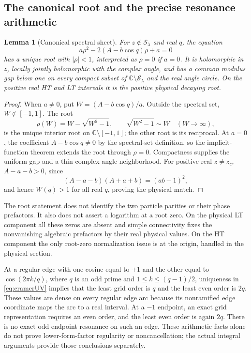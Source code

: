 \documentclass[11pt]{article}
\numberwithin{equation}{section}
\newtheorem{lemma}[theorem]{Lemma}
\theoremstyle{definition}
\newcommand{\C}{\mathbb C}
\newcommand{\cS}{\mathcal S}
\begin{document}
\subsection{The canonical root and the precise resonance arithmetic}

\begin{lemma}[Canonical spectral sheet]\label{lem:canonicalroot}
For \(z\notin\cS_\lambda\) and real \(q\), the equation
\[
 a\rho^2-2(A-b\cos q)\rho+a=0
\]
has a unique root with \(|\rho|<1\), interpreted as \(\rho=0\) if
\(a=0\). It is holomorphic in \(z\), locally jointly holomorphic
with the complex angle, and has a common modulus gap below one on
every compact subset of \(\C\setminus\cS_\lambda\) and the real
angle circle. On the positive real HT and LT intervals it is the
positive physical decaying root.
\end{lemma}
\begin{proof}
When \(a\ne0\), put \(W=(A-b\cos q)/a\). Outside the spectral set,
\(W\notin[-1,1]\). The root
\[
 \rho(W)=W-\sqrt{W^2-1},\qquad \sqrt{W^2-1}\sim W\quad(W\to\infty),
\]
is the unique interior root on \(\C\setminus[-1,1]\); the other root
is its reciprocal. At \(a=0\), the coefficient \(A-b\cos q\ne0\)
by the spectral-set definition, so the implicit-function theorem
extends the root through \(\rho=0\). Compactness supplies the uniform
gap and a thin complex angle neighborhood. For positive real
\(z\ne z_c\), \(A-a-b>0\), since
\[
 (A-a-b)(A+a+b)=(ab-1)^2,
\]
and hence \(W(q)>1\) for all real \(q\), proving the physical match.
\end{proof}

The root statement does not identify the two particle parities or
their phase prefactors. It also does not assert a logarithm at a root
zero. On the physical LT component all these zeros are absent and
simple connectivity fixes the nonvanishing algebraic prefactors by
their real physical values. On the HT component the only root-zero
normalization issue is at the origin, handled in the physical section.

At a regular edge with one cosine equal to \(+1\) and the other
equal to \(\cos(2\pi k/q)\), where \(q\) is an odd prime and
\(1\le k\le(q-1)/2\), uniqueness in \eqref{eq:cramerUV} implies that
the least grid order is \(q\) and the least even order is \(2q\).
These values are dense on every regular edge arc because its
nonramified edge coordinate maps the arc to a real interval. At a
\(-1\) endpoint, an exact grid representation requires an even
order, and the least even order is again \(2q\). There is no exact
odd endpoint resonance on such an edge. These arithmetic facts alone
do not prove lower-form-factor regularity or noncancellation; the
actual integral arguments provide those conclusions separately.
\end{document}
